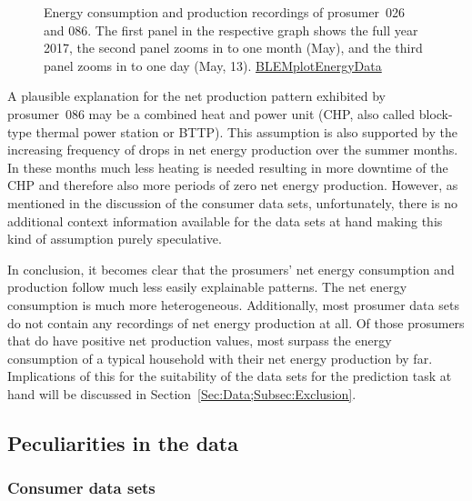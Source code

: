 \begin{figure}
\caption[Energy consumption and production recordings of prosumer~026 and 086]{Energy consumption and production recordings of prosumer~026 and 086. The first panel in the respective graph shows the full year 2017, the second panel zooms in to one month (May), and the third panel zooms in to one day (May, 13). \quantnet\href{https://github.com/QuantLet/BLEM/tree/master/BLEMplotEnergyData}{BLEMplotEnergyData}}
\label{Fig:energyconsprod_p026p086}

\end{figure}
%
A plausible explanation for the net production pattern exhibited by prosumer~086 may be a combined heat and power unit (CHP, also called block-type thermal power station or BTTP). This assumption is also supported by the increasing frequency of drops in net energy production over the summer months. In these months much less heating is needed resulting in more downtime of the CHP and therefore also more periods of zero net energy production. However, as mentioned in the discussion of the consumer data sets, unfortunately, there is no additional context information available for the data sets at hand making this kind of assumption purely speculative.

In conclusion, it becomes clear that the prosumers' net energy consumption and production follow much less easily explainable patterns. The net energy consumption is much more heterogeneous. Additionally, most prosumer data sets do not contain any recordings of net energy production at all. Of those prosumers that do have positive net production values, most surpass the energy consumption of a typical household with their net energy production by far. Implications of this for the suitability of the data sets for the prediction task at hand will be discussed in Section~\ref{Sec:Data;Subsec:Exclusion}.




\subsection{Peculiarities in the data}\label{Sec:Data;Subsec:Peculiarities}



\subsubsection{Consumer data sets}

